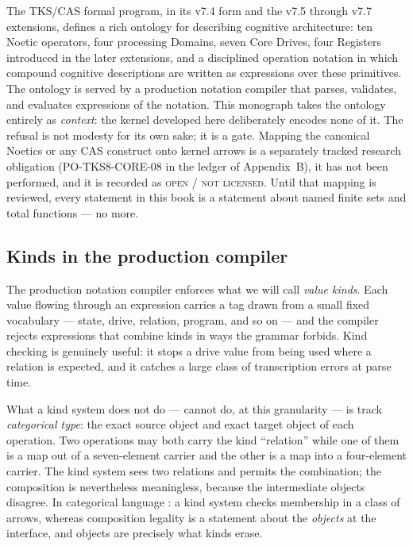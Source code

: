 The TKS/CAS formal program, in its v7.4 form and the v7.5 through v7.7
extensions, defines a rich ontology for describing cognitive architecture: ten
Noetic operators, four processing Domains, seven Core Drives, four
Registers introduced in the later extensions, and a disciplined operation
notation in which compound cognitive descriptions are written as expressions
over these primitives. The ontology is served by a production notation
compiler that parses, validates, and evaluates expressions of the notation.
This monograph takes the ontology entirely as \emph{context}: the kernel
developed here deliberately encodes none of it. The refusal is not modesty
for its own sake; it is a gate. Mapping the canonical Noetics or any CAS
construct onto kernel arrows is a separately tracked research obligation
(PO-TKS8-CORE-08 in the ledger of Appendix~B), it has not been performed, and
it is recorded as \textsc{open / not licensed}. Until that mapping is
reviewed, every statement in this book is a statement about named finite sets
and total functions --- no more.

\subsection{Kinds in the production compiler}

The production notation compiler enforces what we will call \emph{value
kinds}. Each value flowing through an expression carries a tag drawn from a
small fixed vocabulary --- state, drive, relation, program, and so on --- and
the compiler rejects expressions that combine kinds in ways the grammar
forbids. Kind checking is genuinely useful: it stops a drive value from being
used where a relation is expected, and it catches a large class of
transcription errors at parse time.

What a kind system does not do --- cannot do, at this granularity --- is track
\emph{categorical type}: the exact source object and exact target object of
each operation. Two operations may both carry the kind ``relation'' while one
of them is a map out of a seven-element carrier and the other is a map into a
four-element carrier. The kind system sees two relations and permits the
combination; the composition is nevertheless meaningless, because the
intermediate objects disagree. In categorical language
\cite{maclanecwm}: a kind system checks membership in a class of arrows,
whereas composition legality is a statement about the \emph{objects} at the
interface, and objects are precisely what kinds erase.

